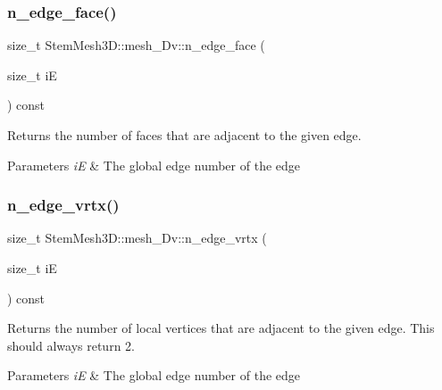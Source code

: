 \subsubsection{\texorpdfstring{n\+\_\+edge\+\_\+face()}{n\_edge\_face()}}
{\footnotesize\ttfamily size\+\_\+t Stem\+Mesh3\+D\+::mesh\+\_\+Dv\+::n\+\_\+edge\+\_\+face (\begin{DoxyParamCaption}\item[{size\+\_\+t}]{iE }\end{DoxyParamCaption}) const}



Returns the number of faces that are adjacent to the given edge. 


\begin{DoxyParams}{Parameters}
{\em iE} & The global edge number of the edge \\
\hline
\end{DoxyParams}
\mbox{\label{classStemMesh3D_1_1mesh__3Dv_a3a0580ffb017ad1118c6b10631b845fb}} 
\subsubsection{\texorpdfstring{n\+\_\+edge\+\_\+vrtx()}{n\_edge\_vrtx()}}
{\footnotesize\ttfamily size\+\_\+t Stem\+Mesh3\+D\+::mesh\+\_\+Dv\+::n\+\_\+edge\+\_\+vrtx (\begin{DoxyParamCaption}\item[{size\+\_\+t}]{iE }\end{DoxyParamCaption}) const}



Returns the number of local vertices that are adjacent to the given edge. This should always return 2. 


\begin{DoxyParams}{Parameters}
{\em iE} & The global edge number of the edge \\
\hline
\end{DoxyParams}
\mbox{\label{classStemMesh3D_1_1mesh__3Dv_a2d8ae772da1e33edfb9332823d4c7212}} 
